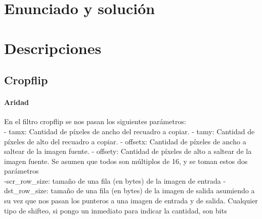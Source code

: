 \documentclass[a4paper]{article}
\begin{document}
\section{Enunciado y solución} 
%
\section{Descripciones}
\subsection{Cropflip}
\paragraph{\textbf{Aridad}}
En el filtro cropflip se nos pasan los siguientes parámetros:
\hfill \break
\\
- tamx: Cantidad de píxeles de ancho del recuadro a copiar.
\hfill \break
- tamy: Cantidad de píxeles de alto del recuadro a copiar.
\hfill \break
- offsetx: Cantidad de píxeles de ancho a saltear de la imagen fuente.
\hfill \break
- offsety: Cantidad de píxeles de alto a saltear de la imagen fuente.
\hfill \break
Se asumen que todos son múltiplos de 16, y se toman estos dos parámetros
\hfill \break
\\
-scr_row_size: tamaño de una fila (en bytes) de la imagen de entrada
\hfill \break
-dst_row_size: tamaño de una fila (en bytes) de la imagen de salida
\hfill \break
asumiendo a su vez que nos pasan los punteros a una imagen de entrada y de salida. Cualquier tipo de shifteo, si pongo un inmediato para indicar la cantidad, son bits
\hfill \break
\end{document}
